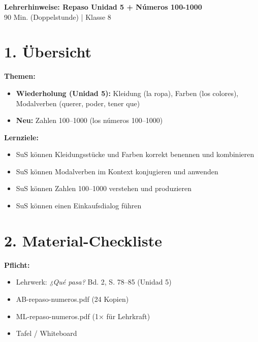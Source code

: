 \documentclass[11pt, a4paper]{article}
\newcommand{\fachfarbe}{spanisch}
\newcommand{\thema}{Repaso Unidad 5 + Números 100-1000}
\newcommand{\klasse}{8}
\newcommand{\dauer}{90 Min. (Doppelstunde)}
\newcommand{\lerngruppengroesse}{24}
\begin{document}

\begin{center}
    {\Large\bfseries\textcolor{\fachfarbe}{Lehrerhinweise: \thema}}\\[0.3em]
    {\normalsize \dauer{} | Klasse \klasse}
\end{center}

\vspace{10pt}


\section*{1. Übersicht}

\textbf{Themen:}
\begin{itemize}[nosep]
    \item \textbf{Wiederholung (Unidad 5):} Kleidung (la ropa), Farben (los colores), Modalverben (querer, poder, tener que)
    \item \textbf{Neu:} Zahlen 100--1000 (los números 100--1000)
\end{itemize}

\textbf{Lernziele:}
\begin{itemize}[nosep]
    \item SuS können Kleidungsstücke und Farben korrekt benennen und kombinieren
    \item SuS können Modalverben im Kontext konjugieren und anwenden
    \item SuS können Zahlen 100--1000 verstehen und produzieren
    \item SuS können einen Einkaufsdialog führen
\end{itemize}


\section*{2. Material-Checkliste}

\begin{materialbox}
\textbf{Pflicht:}
\begin{itemize}[label=$\square$, nosep]
    \item Lehrwerk: \textit{¿Qué pasa?} Bd. 2, S. 78--85 (Unidad 5)
    \item AB-repaso-numeros.pdf (\lerngruppengroesse{} Kopien)
    \item ML-repaso-numeros.pdf (1× für Lehrkraft)
    \item Tafel / Whiteboard
\end{itemize}
\end{materialbox}
\end{document}
